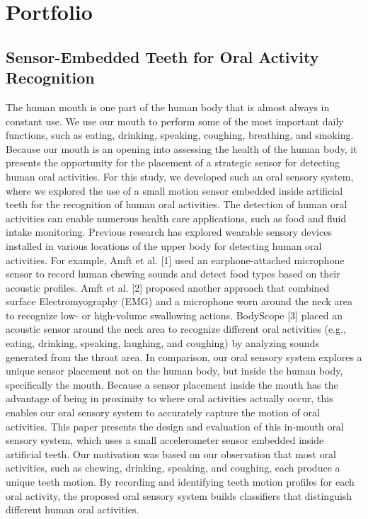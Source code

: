 \chapter{Portfolio}

\section{Sensor-Embedded Teeth for Oral Activity Recognition}

The human mouth is one part of the human body that is almost always in constant use. We use our mouth to perform some of the most important daily functions, such as eating, drinking, speaking, coughing, breathing, and smoking. Because our mouth is an opening into assessing the health of the human body, it presents the opportunity for the placement of a strategic sensor for detecting human oral activities. For this study, we developed such an oral sensory system, where we explored the use of a small motion sensor embedded inside artificial teeth for the recognition of human oral activities. The detection of human oral activities can enable numerous health care applications, such as food and fluid intake monitoring.   
Previous research has explored wearable sensory devices installed in various locations of the upper body for detecting human oral activities. For example, Amft et al. [1] used an earphone-attached microphone sensor to record human chewing sounds and detect food types based on their acoustic profiles. Amft et al. [2] proposed another approach that combined surface Electromyography (EMG) and a microphone worn around the neck area to recognize low- or high-volume swallowing actions. BodyScope [3] placed an acoustic sensor around the neck area to recognize different oral activities (e.g., eating, drinking, speaking, laughing, and coughing) by analyzing sounds generated from the throat area. In comparison, our oral sensory system explores a unique sensor placement not on the human body, but inside the human body, specifically the mouth. Because a sensor placement inside the mouth has the advantage of being in proximity to where oral activities actually occur, this enables our oral sensory system to accurately capture the motion of oral activities. 
This paper presents the design and evaluation of this in-mouth oral sensory system, which uses a small accelerometer sensor embedded inside artificial teeth. Our motivation was based on our observation that most oral activities, such as chewing, drinking, speaking, and coughing, each produce a unique teeth motion. By recording and identifying teeth motion profiles for each oral activity, the proposed oral sensory system builds classifiers that distinguish different human oral activities. 

